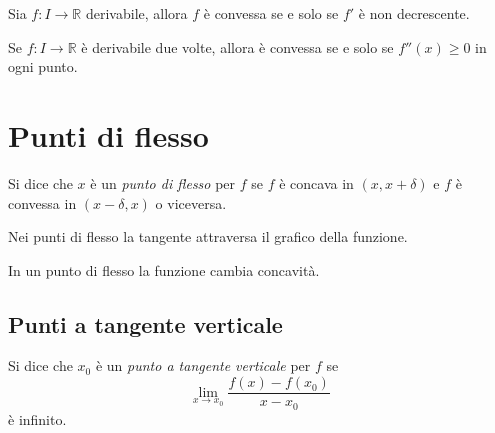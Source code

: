 Sia $f: I \to \mathbb{R}$ derivabile, allora $f$ è convessa se e solo se $f'$ è non decrescente.

Se $f: I \to \mathbb{R}$ è derivabile due volte, allora è convessa se e solo se $f''(x) \ge 0$ in ogni punto.

\section{Punti di flesso}

Si dice che $x$ è un \emph{punto di flesso} per $f$ se $f$ è concava in $(x, x + \delta)$ e $f$ è convessa in $(x-\delta, x)$ o viceversa.

Nei punti di flesso la tangente attraversa il grafico della funzione.

In un punto di flesso la funzione cambia concavità.

\subsection{Punti a tangente verticale}

Si dice che $x_0$ è un \emph{punto a tangente verticale} per $f$ se
\begin{equation*}
\lim_{x \to x_0} \frac{f(x)-f(x_0)}{x-x_0}
\end{equation*}
è infinito.
